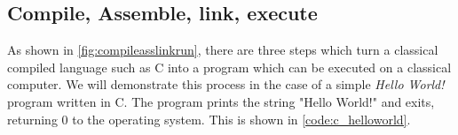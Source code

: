 \subsection{Compile, Assemble, link, execute}

As shown in \autoref{fig:compileasslinkrun}, there are three steps which turn a classical compiled language such as C into a program which can be executed on a classical computer. We will demonstrate this process in the case of a simple \textit{Hello World!} program written in C. The program prints the string "Hello World!" and exits, returning 0 to the operating system. This is shown in \autoref{code:c_helloworld}.

